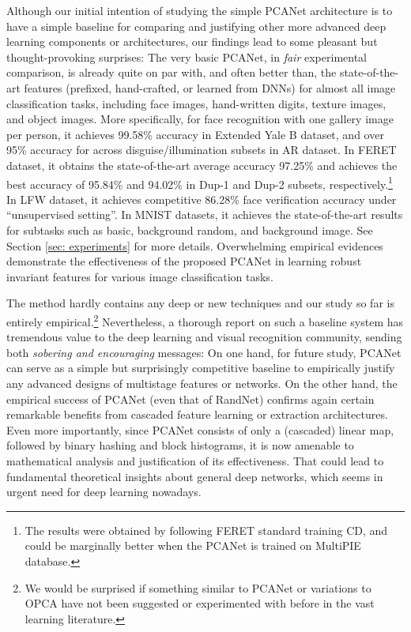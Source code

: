 \documentclass[10pt,journal,compsoc]{IEEEtran}
\begin{document}
Although our initial intention of studying the simple PCANet architecture is to have a simple baseline for comparing and justifying other more advanced deep learning components or architectures, our findings lead to some pleasant but thought-provoking surprises: The very basic PCANet, in {\em fair} experimental comparison, is already quite on par with, and often better than, the state-of-the-art features (prefixed, hand-crafted, or learned from DNNs) for almost all image classification tasks, including face images, hand-written digits, texture images, and object images. More specifically, for face recognition with one gallery image per person, it achieves 99.58\% accuracy in Extended Yale B dataset, and over 95\% accuracy for across disguise/illumination subsets in AR dataset. In FERET dataset, it obtains the state-of-the-art average accuracy 97.25\% and achieves the best accuracy of 95.84\% and 94.02\% in Dup-1 and Dup-2 subsets, respectively.\footnote{The results were obtained by following FERET standard training CD, and could be marginally better when the PCANet is trained on MultiPIE database.} In LFW dataset, it achieves competitive 86.28\% face verification accuracy under ``unsupervised setting''. In MNIST datasets, it achieves the state-of-the-art results for subtasks such as basic, background random, and background image. See Section \ref{sec: experiments} for more details. Overwhelming empirical evidences demonstrate the effectiveness of the proposed PCANet in learning robust invariant features for various image classification tasks.

The method hardly contains any deep or new techniques and our study so far is entirely empirical.\footnote{We would be surprised if something similar to PCANet or variations to OPCA \cite{Burges2003} have not been suggested or experimented with before in the vast learning literature.} Nevertheless, a thorough report on such a baseline system has tremendous value to the deep learning and visual recognition community, sending both {\em sobering and encouraging} messages: On one hand, for future study, PCANet can serve as a simple but surprisingly competitive baseline to empirically justify any advanced designs of multistage features or networks. On the other hand, the empirical success of PCANet (even that of RandNet) confirms again certain remarkable benefits from cascaded feature learning or extraction architectures. Even more importantly, since PCANet consists of only a (cascaded) linear map, followed by binary hashing and block histograms, it is now amenable to mathematical analysis and justification of its effectiveness. That could lead to fundamental theoretical insights about general deep networks, which seems in urgent need for deep learning nowadays.
\end{document}
